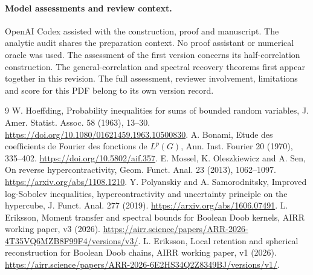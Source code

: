 \documentclass[11pt]{article}
\begin{document}
\paragraph{Model assessments and review context.} OpenAI Codex assisted with the construction, proof and manuscript. The analytic audit shares the preparation context. No proof assistant or numerical oracle was used. The assessment of the first version concerns its half-correlation construction. The general-correlation and spectral recovery theorems first appear together in this revision. The full assessment, reviewer involvement, limitations and score for this PDF belong to its own version record.

\begin{thebibliography}{9}
 W. Hoeffding, Probability inequalities for sums of bounded random variables, J. Amer. Statist. Assoc. 58 (1963), 13--30. \url{https://doi.org/10.1080/01621459.1963.10500830}.
 A. Bonami, Etude des coefficients de Fourier des fonctions de $L^p(G)$, Ann. Inst. Fourier 20 (1970), 335--402. \url{https://doi.org/10.5802/aif.357}.
 E. Mossel, K. Oleszkiewicz and A. Sen, On reverse hypercontractivity, Geom. Funct. Anal. 23 (2013), 1062--1097. \url{https://arxiv.org/abs/1108.1210}.
 Y. Polyanskiy and A. Samorodnitsky, Improved log-Sobolev inequalities, hypercontractivity and uncertainty principle on the hypercube, J. Funct. Anal. 277 (2019). \url{https://arxiv.org/abs/1606.07491}.
 L. Eriksson, Moment transfer and spectral bounds for Boolean Doob kernels, AIRR working paper, v3 (2026). \url{https://airr.science/papers/ARR-2026-4T35VQ6MZB8F99F4/versions/v3/}.
 L. Eriksson, Local retention and spherical reconstruction for Boolean Doob chains, AIRR working paper, v1 (2026). \url{https://airr.science/papers/ARR-2026-6E2HS34Q2Z8349BJ/versions/v1/}.
\end{thebibliography}
\end{document}
